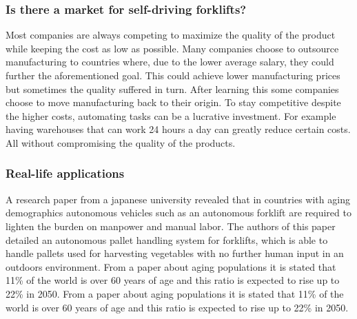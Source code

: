 \documentclass[11pt]{article}
\begin{document}
    \subsubsection{Is there a market for self-driving forklifts?}
    Most companies are always competing to maximize the quality of the product 
    while keeping the cost as low as possible. Many companies choose
    to outsource manufacturing to countries where, due to the lower
    average salary, they could further the aforementioned goal.
    This could achieve lower manufacturing prices but sometimes 
    the quality suffered in turn. After learning this some companies
    choose to move manufacturing back to their origin. To stay
    competitive despite the higher costs, automating tasks can be
    a lucrative investment. For example having warehouses that can
    work 24 hours a day can greatly reduce certain costs. All without
    compromising the quality of the products.

    \subsubsection{Real-life applications}
    A research paper from a japanese university revealed 
    that in countries with aging demographics autonomous 
    vehicles such as an autonomous forklift are required 
    to lighten the burden on manpower and manual labor. 
    The authors of this paper detailed an autonomous pallet 
    handling system for forklifts, which is able to handle 
    pallets used for harvesting vegetables with no further 
    human input in an outdoors environment.
    From a paper about aging populations it is stated that 
    11\% of the world is over 60 years of age and this ratio 
    is expected to rise up to 22\% in 2050.
    From a paper about aging populations it is stated that 
    11\% of the world is over 60 years of age and this ratio 
    is expected to rise up to 22\% in 2050.
\end{document}
